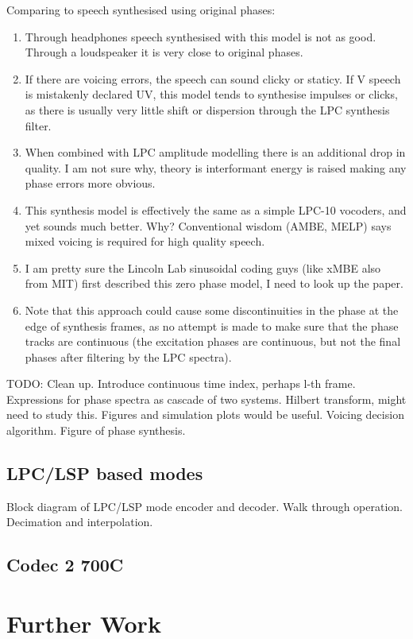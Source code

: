 \documentclass{article}
\begin{document}
Comparing to speech synthesised using original phases:
\begin{enumerate}
\item Through headphones speech synthesised with this model is not as good. Through a loudspeaker it is very close to original phases.
\item If there are voicing errors, the speech can sound clicky or staticy.  If V speech is mistakenly declared UV, this model tends to synthesise impulses or clicks, as there is usually very little shift or dispersion through the LPC synthesis filter.
\item When combined with LPC amplitude modelling there is an additional drop in quality.  I am not sure why, theory is interformant energy is raised making any phase errors more obvious.
\item This synthesis model is effectively the same as a simple LPC-10 vocoders, and yet sounds much better.  Why? Conventional wisdom (AMBE, MELP) says mixed voicing is required for high quality speech.
\item I am pretty sure the Lincoln Lab sinusoidal coding guys (like xMBE also from MIT) first described this zero phase model, I need to look up the paper.
\item Note that this approach could cause some discontinuities in the phase at the edge of synthesis frames, as no attempt is made to make sure that the phase tracks are continuous (the excitation phases are continuous, but not the final phases after filtering  by the LPC spectra).
\end{enumerate}

TODO: Clean up. Introduce continuous time index, perhaps l-th frame.  Expressions for phase spectra as cascade of two systems. Hilbert transform, might need to study this.  Figures and simulation plots would be useful.  Voicing decision algorithm.  Figure of phase synthesis.

\subsection{LPC/LSP based modes}

Block diagram of LPC/LSP mode encoder and decoder.  Walk through operation.  Decimation and interpolation.

\subsection{Codec 2 700C}

\section{Further Work}
\end{document}
